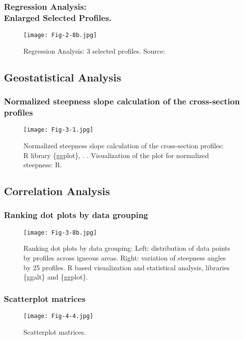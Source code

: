 \documentclass[pdflatex,compress,8pt,
	xcolor={dvipsnames,dvipsnames,svgnames,x11names,table},
	hyperref={colorlinks = true,breaklinks = true, urlcolor = NavyBlue, breaklinks = true}]{beamer}
\begin{document}
\begin{frame}\frametitle{Regression Analysis:\\Enlarged Selected Profiles.}
\begin{figure}[H]
	\centering
		\texttt{[image: Fig-2-8b.jpg]}
	\caption{Regression Analysis: 3 selected profiles. Source: \cite{Lemenkova201904}}
\end{figure}		
\end{frame}

\subsection{Geostatistical Analysis}

\begin{frame}\frametitle{Normalized steepness slope calculation of the cross-section profiles}
\begin{figure}[H]
	\centering
		\texttt{[image: Fig-3-1.jpg]}\caption{Normalized steepness slope calculation of the cross-section profiles: R library \{ggplot\}, \cite{RCoreTeam2014}. \cite{Lemenkova201871}. Visualization of the plot for normalized steepness: R.}
\end{figure}		
\end{frame}

\subsection{Correlation Analysis}

\begin{frame}\frametitle{Ranking dot plots by data grouping}
\begin{figure}[H]
	\centering
		\texttt{[image: Fig-3-8b.jpg]}
	\caption{Ranking dot plots by data grouping: Left: distribution of data points by profiles across igneous areas. Right: variation of steepness angles by 25 profiles. R based visualization and statistical analysis, libraries \{ggalt\} and \{ggplot\}. \cite{Lemenkova201904}}
\end{figure}		
\end{frame}

\begin{frame}\frametitle{Scatterplot matrices}
\begin{figure}[H]
	\centering
		\texttt{[image: Fig-4-4.jpg]}
	\caption{Scatterplot matrices. \cite{Lemenkova201901}}
\end{figure}		
\end{frame}
\end{document}

